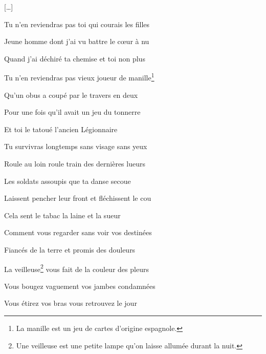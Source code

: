 	{
\setlength{\parskip}{0pt}
	\begin{center}
	[…]
	\end{center}
		
Tu n'en reviendras pas toi qui courais les filles

Jeune homme dont j'ai vu battre le cœur à nu

Quand j'ai déchiré ta chemise et toi non plus

Tu n'en reviendras pas vieux joueur de manille\footnote{La manille est un jeu de cartes d'origine espagnole.}

\bigskip

Qu'un obus a coupé par le travers en deux

Pour une fois qu'il avait un jeu du tonnerre

Et toi le tatoué l'ancien Légionnaire

Tu survivras longtemps sans visage sans yeux

\bigskip

Roule au loin roule train des dernières lueurs

Les soldats assoupis que ta danse secoue

Laissent pencher leur front et fléchissent le cou

Cela sent le tabac la laine et la sueur

\bigskip

Comment vous regarder sans voir vos destinées

Fiancés de la terre et promis des douleurs

La veilleuse\footnote{Une veilleuse est une petite lampe qu'on laisse allumée durant la nuit.} vous fait de la couleur des pleurs

Vous bougez vaguement vos jambes condamnées

\bigskip

Vous étirez vos bras vous retrouvez le jour

}
